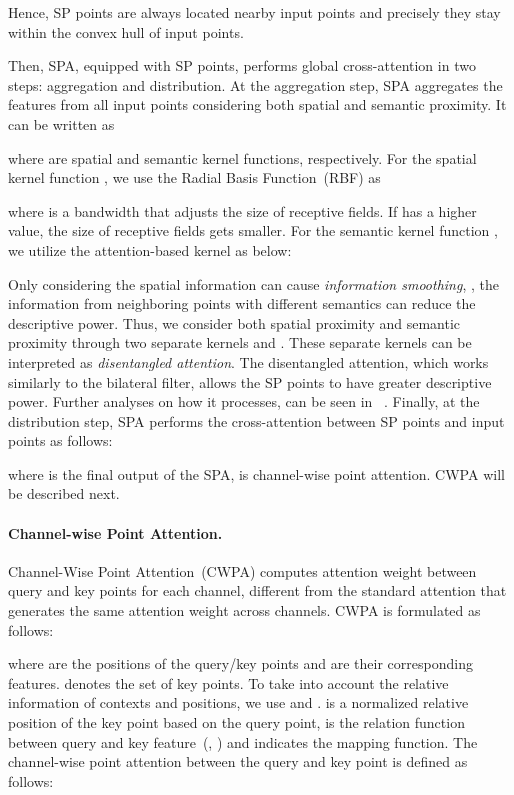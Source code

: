 \documentclass[10pt,twocolumn,letterpaper]{article}
\begin{document}
Hence, SP points are always located nearby input points and precisely they stay within the convex hull of input points.


Then, SPA, equipped with SP points, performs global cross-attention in two steps: aggregation and distribution.
At the aggregation step, SPA aggregates the features from all input points considering both spatial and semantic proximity. It can be written as

where  are spatial and semantic kernel functions, respectively.
For the spatial kernel function , we use the Radial Basis Function~(RBF) as

where  is a bandwidth that adjusts the size of receptive fields.
If  has a higher value, the size of receptive fields gets smaller.
For the semantic kernel function , we utilize the attention-based kernel as below:

Only considering the spatial information can cause \textit{information smoothing}, \ie, the information from neighboring points with different semantics can reduce the descriptive power.
Thus, we consider both spatial proximity and semantic proximity through two separate kernels  and .
These separate kernels can be interpreted as \textit{disentangled attention}.
The disentangled attention, which works similarly to the bilateral filter, allows the SP points to have greater descriptive power.
Further analyses on how it processes, can be seen in ~. 
Finally, at the distribution step, SPA performs the cross-attention between SP points and input points as follows:

where  is the final output of the SPA,  is channel-wise point attention. CWPA will be described next.



\paragraph{Channel-wise Point Attention.}
Channel-Wise Point Attention~(CWPA) computes attention weight between query and key points for each channel, different from the standard attention that generates the same attention weight across channels.
CWPA is formulated as follows:

where  are the positions of the query/key points and  are their corresponding features.  denotes the set of key points. 
To take into account the relative information of contexts and positions, we use  and .
 is a normalized relative position of the key point based on the query point,  is the relation function between query and key feature~(\eg, ) and  indicates the mapping function.
The channel-wise point attention  between the query and key point is defined as follows:
\end{document}
